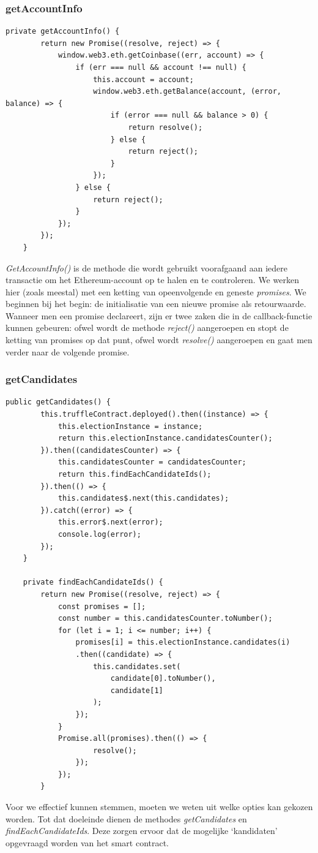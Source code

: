 	\subsubsection{getAccountInfo}
	\lstset{language=JavaScriptSolidity} 
	\begin{lstlisting}[numbers=none]
	private getAccountInfo() {
		return new Promise((resolve, reject) => {
			window.web3.eth.getCoinbase((err, account) => {
				if (err === null && account !== null) {
					this.account = account;
					window.web3.eth.getBalance(account, (error, balance) => {
						if (error === null && balance > 0) {
							return resolve();
						} else {
							return reject();
						}
					});
				} else {
					return reject();
				}
			});
		});
	}
	\end{lstlisting}
	 \textit{GetAccountInfo()} is de methode die wordt gebruikt voorafgaand aan iedere transactie om het Ethereum-account op te halen en te controleren. We werken hier (zoals meestal) met een ketting van opeenvolgende en geneste \textit{promises}. We beginnen bij het begin: de initialisatie van een nieuwe promise als retourwaarde. Wanneer men een promise declareert, zijn er twee zaken die in de callback-functie kunnen gebeuren:  ofwel wordt de methode \textit{reject()} aangeroepen en stopt de ketting van promises op dat punt, ofwel wordt \textit{resolve()} aangeroepen en gaat men verder naar de volgende promise.
	\subsubsection{getCandidates}
	\lstset{language=JavaScriptSolidity} 
	\begin{lstlisting}[numbers=none]
	public getCandidates() {
		this.truffleContract.deployed().then((instance) => {
			this.electionInstance = instance;
			return this.electionInstance.candidatesCounter();
		}).then((candidatesCounter) => {
			this.candidatesCounter = candidatesCounter;
			return this.findEachCandidateIds();
		}).then(() => {
			this.candidates$.next(this.candidates);
		}).catch((error) => {
			this.error$.next(error);
			console.log(error);
		});
	}
		
	private findEachCandidateIds() {
		return new Promise((resolve, reject) => {
			const promises = [];
			const number = this.candidatesCounter.toNumber();
			for (let i = 1; i <= number; i++) {
				promises[i] = this.electionInstance.candidates(i)
				.then((candidate) => {
					this.candidates.set(
						candidate[0].toNumber(),
						candidate[1]
					);
				});
			}
			Promise.all(promises).then(() => {
					resolve();
				});
			});
		}
		\end{lstlisting}
		Voor we effectief kunnen stemmen, moeten we weten uit welke opties kan gekozen worden. Tot dat doeleinde dienen de methodes \textit{getCandidates} en \textit{findEachCandidateIds}. Deze zorgen ervoor dat de mogelijke `kandidaten' opgevraagd worden van het smart contract. 
		
